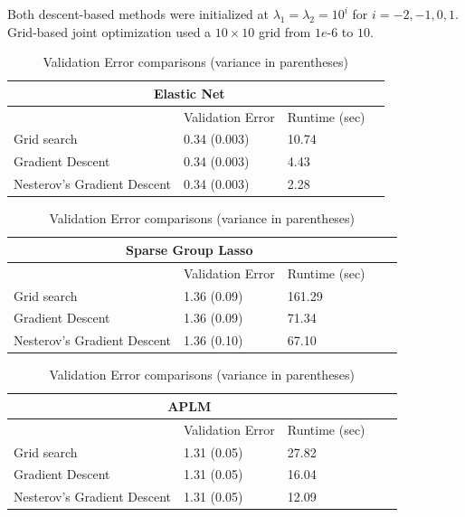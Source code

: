 \documentclass[10pt,letterpaper]{article}
\begin{document}
Both descent-based methods were initialized at $\lambda_1 = \lambda_2 = 10^i$ for $i=-2, -1, 0, 1$. Grid-based joint optimization used a $10 \times 10$ grid from $1e\text{-}6$ to $10$.


\begin{table} 
\begin{center}

\begin{tabular}{| l | l | l | l | }
\hline
\multicolumn{3}{|c|}{Elastic Net}\\
\hline
 & Validation Error & Runtime (sec) \\
\hline
Grid search & 0.34 (0.003) & 10.74\\
\hline
Gradient Descent & 0.34 (0.003) & 4.43 \\
\hline
Nesterov's Gradient Descent & 0.34 (0.003) & 2.28 \\
\hline
\end{tabular}


\begin{tabular}{| l | l | l | l | l | }
\hline
\multicolumn{3}{|c|}{Sparse Group Lasso}\\
\hline
 & Validation Error & Runtime (sec) \\
\hline
Grid search & 1.36 (0.09) & 161.29 \\
\hline
Gradient Descent  & 1.36 (0.09) & 71.34 \\
\hline
Nesterov's Gradient Descent  & 1.36 (0.10) & 67.10 \\
\hline
\end{tabular}

\begin{tabular}{| l | l | l | l | l | }
\hline
\multicolumn{3}{|c|}{APLM}\\
\hline
 & Validation Error & Runtime (sec) \\
\hline
Grid search  & 1.31 (0.05) & 27.82 \\
\hline
Gradient Descent  & 1.31 (0.05) & 16.04 \\
\hline
Nesterov's Gradient Descent  & 1.31 (0.05) & 12.09 \\
\hline
\end{tabular}

\end{center}
\caption {Validation Error comparisons (variance in parentheses)}
\label{table:validation}
\end{table}


\end{document}
